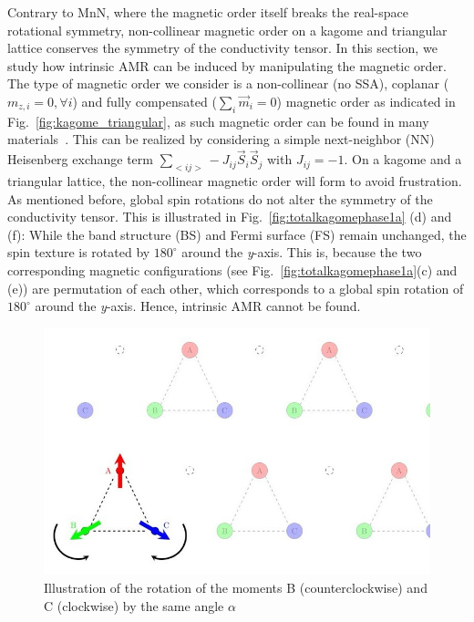 \documentclass[prb,showpacs,amsmath,amssymb,superscriptaddress,twocolumn,floatfix]{revtex4-1}
\begin{document}
{\color{blue} Contrary to MnN, where the magnetic order itself breaks the real-space rotational symmetry, non-collinear magnetic order on a kagome and triangular lattice conserves the symmetry of the conductivity tensor. In this section, we study how intrinsic AMR can be induced by manipulating the magnetic order. The type of magnetic order we consider is a} non-collinear (no SSA), coplanar ($m_{z,i} = 0, \forall i$) and fully compensated ($\sum_i \vec{m}_i = 0$) magnetic order as indicated in Fig.~\ref{fig:kagome_triangular}, as such magnetic order can be found in many materials~\cite{Siddiqui:2020}. This can be realized by considering a simple next-neighbor (NN) Heisenberg exchange term $\sum_{<ij>} -J_{ij} \vec{S}_i \vec{S}_j$ with $J_{ij} = -1$. On a kagome and a triangular lattice, the non-collinear magnetic order will form to avoid frustration. As mentioned before, global spin rotations do not alter the symmetry of the conductivity tensor. This is illustrated in Fig.~\ref{fig:totalkagomephase1a} (d) and (f): While the band structure (BS) and Fermi surface (FS) remain unchanged, the spin texture is rotated by $180^\circ$ around the \textit{y}-axis. This is, because the two corresponding magnetic configurations (see Fig.~\ref{fig:totalkagomephase1a}(c) and (e)) are permutation of each other, which corresponds to a global spin rotation of $180^\circ$ around the \textit{y}-axis. Hence, intrinsic AMR cannot be found. 


\begin{figure}
	\centering
	\includegraphics[width=0.9\linewidth]{img/kagome_rotation}
	\caption{Illustration of the rotation of the moments B (counterclockwise) and C (clockwise) by the same angle $\alpha$}
	\label{fig:kagomerotation}
\end{figure}
\end{document}
